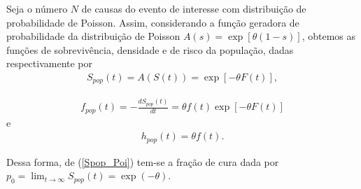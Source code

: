 Seja o número $N$ de causas do evento de interesse com distribuição de probabilidade de Poisson. Assim, considerando a função geradora de probabilidade da distribuição de Poisson $A(s) = \exp[\theta(1-s)]$, obtemos as funções de sobrevivência, densidade e de risco da população, dadas respectivamente por
\begin{align}\label{Spop_Poi}
S_{pop}(t)=	A(S(t))=\exp\left[-\theta F(t)\right],
\end{align}

\begin{align}
f_{pop}(t) = -\frac{dS_{pop}(t)}{dt} = \theta f(t)\exp\left[-\theta F(t)\right] \label{fpop_Poi}
\end{align}
e
\begin{align}
h_{pop}(t)= \theta f(t). \label{hpop_Poi}
\end{align}

Dessa forma, de (\ref{Spop_Poi}) tem-se a fração de cura dada por $p_{0}=\displaystyle \lim_{t\rightarrow \infty}{S_{pop}(t)} = \exp(-\theta)$.







